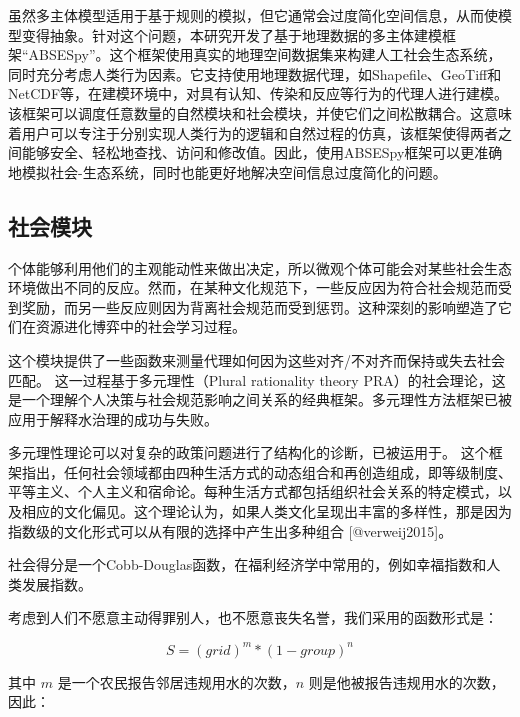 虽然多主体模型适用于基于规则的模拟，但它通常会过度简化空间信息，从而使模型变得抽象。针对这个问题，本研究开发了基于地理数据的多主体建模框架“ABSESpy”。这个框架使用真实的地理空间数据集来构建人工社会生态系统，同时充分考虑人类行为因素。它支持使用地理数据代理，如Shapefile、GeoTiff和NetCDF等，在建模环境中，对具有认知、传染和反应等行为的代理人进行建模。该框架可以调度任意数量的自然模块和社会模块，并使它们之间松散耦合。这意味着用户可以专注于分别实现人类行为的逻辑和自然过程的仿真，该框架使得两者之间能够安全、轻松地查找、访问和修改值。因此，使用ABSESpy框架可以更准确地模拟社会-生态系统，同时也能更好地解决空间信息过度简化的问题。

\subsection{社会模块}

个体能够利用他们的主观能动性来做出决定，所以微观个体可能会对某些社会生态环境做出不同的反应。然而，在某种文化规范下，一些反应因为符合社会规范而受到奖励，而另一些反应则因为背离社会规范而受到惩罚。这种深刻的影响塑造了它们在资源进化博弈中的社会学习过程。

这个模块提供了一些函数来测量代理如何因为这些对齐/不对齐而保持或失去社会匹配。
这一过程基于多元理性（Plural rationality theory PRA）的社会理论，这是一个理解个人决策与社会规范影响之间关系的经典框架。多元理性方法框架已被应用于解释水治理的成功与失败。  %

多元理性理论可以对复杂的政策问题进行了结构化的诊断，已被运用于。
这个框架指出，任何社会领域都由四种生活方式的动态组合和再创造组成，即等级制度、平等主义、个人主义和宿命论。每种生活方式都包括组织社会关系的特定模式，以及相应的文化偏见。这个理论认为，如果人类文化呈现出丰富的多样性，那是因为指数级的文化形式可以从有限的选择中产生出多种组合 [@verweij2015]。

社会得分是一个Cobb-Douglas函数，在福利经济学中常用的，例如幸福指数和人类发展指数。

考虑到人们不愿意主动得罪别人，也不愿意丧失名誉，我们采用的函数形式是：

\begin{equation}
    S = {(grid)}^m * {(1 - group)}^n
    \label{ch6:eq:society}
\end{equation}

其中 $m$ 是一个农民报告邻居违规用水的次数，$n$ 则是他被报告违规用水的次数，因此：

